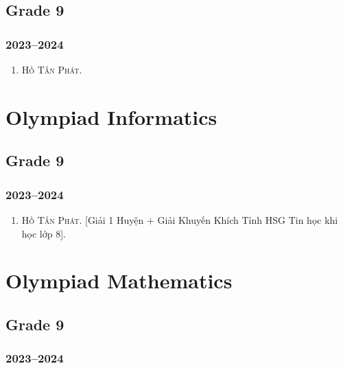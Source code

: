 \documentclass{article}
\begin{document}

\subsection{Grade 9}

\subsubsection{2023--2024}

\begin{enumerate}
	\item \textsc{Hồ Tấn Phát.}
\end{enumerate}


\section{Olympiad Informatics}

\subsection{Grade 9}

\subsubsection{2023--2024}

\begin{enumerate}
	\item \textsc{Hồ Tấn Phát.} [Giải 1 Huyện $+$ Giải Khuyến Khích Tỉnh HSG Tin học khi học lớp 8].
\end{enumerate}


\section{Olympiad Mathematics}

\subsection{Grade 9}

\subsubsection{2023--2024}
\end{document}
